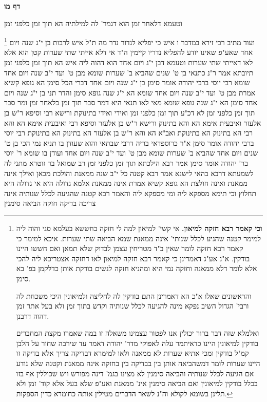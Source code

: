\documentclass[12pt, openany]{book}
\newcommand{\sethebfont}{
\fontsize{10.5pt}{21.0pt} \selectfont
}
\newcommand{\twocol}[1]{
	{\sethebfont \begin{multicols}{2}
			#1
	\end{multicols}}	
}
\newcommand{\sectname}{}
\newcommand{\newsection}[1]{
	\addcontentsline{toc}{section}{#1}
	\renewcommand{\sectname}{#1}	
	\vspace{-\baselineskip}
	\begin{center}
		\textbf{%
\fontsize{16pt}{16pt}\selectfont
			#1}
	\end{center}
	\vspace{-\baselineskip}
	\nopagebreak
}
\newcommand{\footnotecomment}[1]{
	\renewcommand\thefootnote{}
	\footnote{#1}}
\newcommand{\commenta}[1]{\footnotecomment{#1}}
\begin{document}
\newsection{דף מו}
\twocol{וטעמא דלאחר זמן הוא דגמר' לה למילתיה הא תוך זמן כלפני זמן 
\commenta{\textbf{וכי קאמר רבא חזקה למיאון.} אי קשי' למיאון למה לי חזקה בחששא בעלמא סגי והוה ליה למימר קטנה שהגיע לכלל שנותי' אינה ממאנת שמא הביאה שתי שערות. איכא למימר כי קאמר רבא חזקה לומר שאין ב"ד מטריחין עצמן לבדוק שלא תמאן ואם חששו היינו בודקין. א"נ אע"ג דאמרינן כי קאמר רבא חזקה למיאון לאו דחזקה אצטריכא ליה להכי אלא לומר דלא ממאנה וחזקה נמי היא ומהניא חזקה לנשים בודקת אותן כדלקמן בפ' בא סימן.\par והראשונים שאלו א"כ הא דאמרינן התם בודקין לה לחליצה ולמיאונין היכי משכחת לה ורבי' הגדול השיב נפקא מינה להגיעה לכלל שנותיה וקדש בתוך זמן ולא בעל אתר זמן דהוה דרבנן.\par ואלמלא שזה דבר ברור יכולין אנו לפטור עצמינו משאלה זו במה שאמרו מקצת המחברים בודקין למיאונין היינו כדאיתמר עלה לאפוקי מדר' יהודה דאמר עד שירבה שחור על הלבן קמ"ל בודקין ומכי אתיא שערות לא ממאנה ולאו למימרא דבדיקה צריך אלא בדיקה זו היינו שערות לומר דמשהביאה אותן בין בבדיקה בין בחזקה אינה ממאנת וקטנה שלא נודע אם הגיעה לכלל שנותיה והביאה סימנין לא מצינו בגמ' דינה מפורש ויש שכוללין אף בזו בכלל בודקין למיאונין ואם הביאה סימנין אינ' ממאנת ואע"פ שלא בעל אלא קוד' זמן ולא תלינן בשומא לקולא וה"נ לשאר הדברים מטילין אותה כחומרא כדין הספקות. }
ועוד מתיב רבי זירא {במדבר ו } איש כי יפליא לנדור נדר מה ת"ל איש לרבות בן י"ג שנה ויום אחד שאע"פ שאינו יודע להפליא נדריו קיימין 
ה"ד אי דלא אייתי שתי שערות קטן הוא אלא לאו דאייתי שתי שערות וטעמא דבן י"ג ויום אחד הוא דהוה ליה איש הא תוך זמן כלפני זמן תיובתא 
אמר ר"נ כתנאי בן ט' שנים שהביא ב' שערות שומא מבן ט' ועד י"ב שנה ויום אחד שומא רבי יוסי ברבי יהודה אומר סימן בן י"ג שנה ויום אחד דברי הכל סימן 
הא גופא קשיא אמרת מבן ט' ועד י"ב שנה ויום אחד שומא הא י"ג שנה גופא סימן והדר תני בן י"ג שנה ויום אחד סימן הא י"ג שנה גופא שומא 
מאי לאו תנאי היא דמר סבר תוך זמן כלאחר זמן ומר סבר תוך זמן כלפני זמן 
לא דכ"ע תוך זמן כלפני זמן ואידי ואידי בתינוקת ורישא רבי וסיפא ר"ש בן אלעזר 
ואיבעית אימא הא והא בתינוק ורישא ר"ש בן אלעזר וסיפא רבי 
ואיבעית אימא הא והא רבי הא בתינוק הא בתינוקת ואב"א הא והא ר"ש בן אלעזר הא בתינוק הא בתינוקת 
רבי יוסי ברבי יהודה אומר סימן א"ר כרוספדאי בריה דרבי שבתאי והוא שעודן בו 
תניא נמי הכי בן ט' שנים ויום אחד שהביא ב' שערות שומא מבן ט' ועד י"ב שנה ויום אחד ועודן בו שומא ר' יוסי בר' יהודה אומר סימן 
אמר רבא הילכתא תוך זמן כלפני זמן רב שמואל בר זוטרא מתני לה לשמעתא דרבא בהאי לישנא אמר רבא קטנה כל י"ב שנה ממאנת והולכת מכאן ואילך אינה ממאנת ואינה חולצת 
הא גופא קשיא אמרת אינה ממאנת אלמא גדולה היא אי גדולה היא תחלוץ 
וכי תימא מספקא ליה ומי מספקא ליה והאמר רבא קטנה שהגיעה לכלל שנותיה אינה צריכה בדיקה חזקה הביאה סימנין 
}
\end{document}
